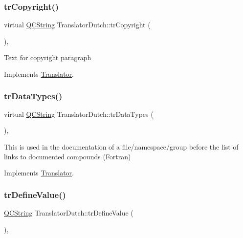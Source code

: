 \subsubsection{\texorpdfstring{trCopyright()}{trCopyright()}}
{\footnotesize\ttfamily virtual \mbox{\hyperlink{class_q_c_string}{Q\+C\+String}} Translator\+Dutch\+::tr\+Copyright (\begin{DoxyParamCaption}{ }\end{DoxyParamCaption})\hspace{0.3cm}{\ttfamily [inline]}, {\ttfamily [virtual]}}

Text for copyright paragraph 

Implements \mbox{\hyperlink{class_translator}{Translator}}.

\mbox{\label{class_translator_dutch_a3a8bb02a7979cc69dfd836dcb744aa59}} 
\subsubsection{\texorpdfstring{trDataTypes()}{trDataTypes()}}
{\footnotesize\ttfamily virtual \mbox{\hyperlink{class_q_c_string}{Q\+C\+String}} Translator\+Dutch\+::tr\+Data\+Types (\begin{DoxyParamCaption}{ }\end{DoxyParamCaption})\hspace{0.3cm}{\ttfamily [inline]}, {\ttfamily [virtual]}}

This is used in the documentation of a file/namespace/group before the list of links to documented compounds (Fortran) 

Implements \mbox{\hyperlink{class_translator}{Translator}}.

\mbox{\label{class_translator_dutch_aba057ef360f8d5f2c47713924302bec2}} 
\subsubsection{\texorpdfstring{trDefineValue()}{trDefineValue()}}
{\footnotesize\ttfamily \mbox{\hyperlink{class_q_c_string}{Q\+C\+String}} Translator\+Dutch\+::tr\+Define\+Value (\begin{DoxyParamCaption}{ }\end{DoxyParamCaption})\hspace{0.3cm}{\ttfamily [inline]}, {\ttfamily [virtual]}}

